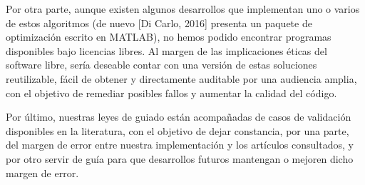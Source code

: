 Por otra parte, aunque existen algunos desarrollos que implementan uno o varios de estos algoritmos (de nuevo [Di Carlo, 2016] presenta un paquete de optimización escrito en MATLAB), no hemos podido encontrar programas disponibles bajo licencias libres. Al margen de las implicaciones éticas del software libre, sería deseable contar con una versión de estas soluciones reutilizable, fácil de obtener y directamente auditable por una audiencia amplia, con el objetivo de remediar posibles fallos y aumentar la calidad del código.

Por último, nuestras leyes de guiado están acompañadas de casos de validación disponibles en la literatura, con el objetivo de dejar constancia, por una parte, del margen de error entre nuestra implementación y los artículos consultados, y por otro servir de guía para que desarrollos futuros mantengan o mejoren dicho margen de error.

\clearpage
